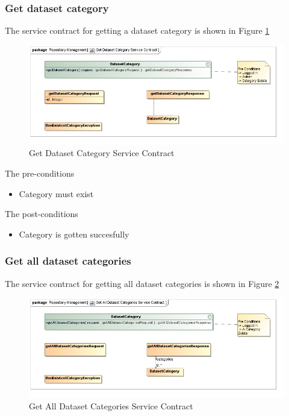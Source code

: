 \subsubsection {Get dataset category}

The service contract for getting a dataset category is shown in Figure \ref{fig:getDatasetCatService}
\begin{figure}[H]
  \begin{center}
  \includegraphics[scale=0.6]{../Diagrams and Charts/Test Data/Get Dataset Category Service Contract.jpg}
  \caption{Get Dataset Category Service Contract}
  \label{fig:getDatasetCatService}
  \end{center}
  
\end{figure}

The pre-conditions
\begin{itemize}
  \item Category must exist
\end{itemize}

The post-conditions
\begin{itemize}
  \item Category is gotten succesfully
\end{itemize}

\subsubsection {Get all dataset categories}

The service contract for getting all dataset categories is shown in Figure \ref{fig:getAllDatasetCatService}
\begin{figure}[H]
  \begin{center}
  \includegraphics[scale=0.6]{../Diagrams and Charts/Test Data/Get All Dataset Categories Service Contract.jpg}
  \caption{Get All Dataset Categories Service Contract}
  \label{fig:getAllDatasetCatService}
  \end{center}
  
\end{figure}

